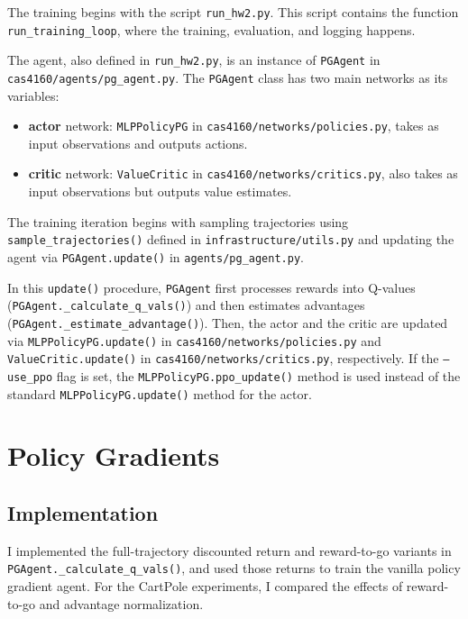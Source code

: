 \documentclass{article}
\begin{document}
The training begins with the script \texttt{run\_hw2.py}. This script contains the function \texttt{run\_training\_loop}, where the training, evaluation, and logging happens.

The agent, also defined in \texttt{run\_hw2.py}, is an instance of \texttt{PGAgent} in \texttt{cas4160/agents/pg\_agent.py}. The \texttt{PGAgent} class has two main networks as its variables:
\begin{itemize}
    \item \textbf{actor} network: \texttt{MLPPolicyPG} in \texttt{cas4160/networks/policies.py}, takes as input observations and outputs actions.
    \item \textbf{critic} network: \texttt{ValueCritic} in \texttt{cas4160/networks/critics.py}, also takes as input observations but outputs value estimates.
\end{itemize}

The training iteration begins with sampling trajectories using \texttt{sample\_trajectories()} defined in \texttt{infrastructure/utils.py} and updating the agent via \texttt{PGAgent.update()} in \texttt{agents/pg\_agent.py}.

In this \texttt{update()} procedure, \texttt{PGAgent} first processes rewards into Q-values (\texttt{PGAgent.\_calculate\_q\_vals()}) and then estimates advantages (\texttt{PGAgent.\_estimate\_advantage()}). Then, the actor and the critic are updated via \texttt{MLPPolicyPG.update()} in \texttt{cas4160/networks/policies.py} and \texttt{ValueCritic.update()} in \texttt{cas4160/networks/critics.py}, respectively. If the \texttt{--use\_ppo} flag is set, the \texttt{MLPPolicyPG.ppo\_update()} method is used instead of the standard \texttt{MLPPolicyPG.update()} method for the actor.

\section{Policy Gradients}
\label{sec:policy_gradient}

\subsection{Implementation}

I implemented the full-trajectory discounted return and reward-to-go variants in \texttt{PGAgent.\_calculate\_q\_vals()}, and used those returns to train the vanilla policy gradient agent. For the CartPole experiments, I compared the effects of reward-to-go and advantage normalization.
\end{document}
